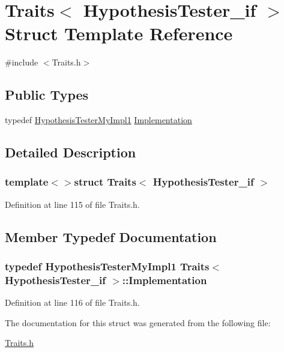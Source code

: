 \hypertarget{struct_traits_3_01_hypothesis_tester__if_01_4}{\section{Traits$<$ Hypothesis\-Tester\-\_\-if $>$ Struct Template Reference}
\label{struct_traits_3_01_hypothesis_tester__if_01_4}
}


{\ttfamily \#include $<$Traits.\-h$>$}

\subsection*{Public Types}
\begin{DoxyCompactItemize}
\item 
typedef \hyperlink{class_hypothesis_tester_my_impl1}{Hypothesis\-Tester\-My\-Impl1} \hyperlink{struct_traits_3_01_hypothesis_tester__if_01_4_a5fd3508bb7c3e86b2b16161c70eae52f}{Implementation}
\end{DoxyCompactItemize}


\subsection{Detailed Description}
\subsubsection*{template$<$$>$struct Traits$<$ Hypothesis\-Tester\-\_\-if $>$}



Definition at line 115 of file Traits.\-h.



\subsection{Member Typedef Documentation}
\hypertarget{struct_traits_3_01_hypothesis_tester__if_01_4_a5fd3508bb7c3e86b2b16161c70eae52f}{
\subsubsection[{Implementation}]{\setlength{\rightskip}{0pt plus 5cm}typedef {\bf Hypothesis\-Tester\-My\-Impl1} {\bf Traits}$<$ {\bf Hypothesis\-Tester\-\_\-if} $>$\-::{\bf Implementation}}}\label{struct_traits_3_01_hypothesis_tester__if_01_4_a5fd3508bb7c3e86b2b16161c70eae52f}


Definition at line 116 of file Traits.\-h.



The documentation for this struct was generated from the following file\-:\begin{DoxyCompactItemize}
\item 
\hyperlink{_traits_8h}{Traits.\-h}\end{DoxyCompactItemize}
